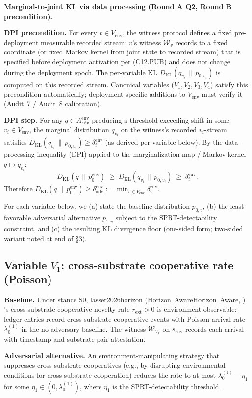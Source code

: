 \documentclass{article}
\makeatletter
\newcommand{\citep}[2][]{%
  \begingroup
  \def\@tmpkey{#2}%
  \ifx\@tmpkey\@empty\else
    (\ifx\@empty#1\@empty\else #1, \fi
     \@nameuse{bibkey@\@tmpkey})%
  \fi
  \endgroup
}
\newcommand{\Aadv}{A_{\mathrm{adv}}}
\newcommand{\deltaadv}{\delta_{\mathrm{adv}}}
\newcommand{\Witness}{\mathcal{W}}
\newcommand{\rext}{r_{\mathrm{ext}}}
\newcommand{\Vem}{V_{\mathrm{env}}}
\makeatother
\begin{document}
\textbf{Marginal-to-joint KL via data processing (Round A Q2,
Round B precondition).}

\textbf{DPI precondition.}  For every $v \in \Vem$, the witness
protocol defines a fixed pre-deployment measurable recorded stream:
$v$'s witness $\Witness_v$ records to a fixed coordinate (or fixed
Markov kernel from joint state to recorded stream) that is
specified before deployment activation per (C12.PUB) and does not
change during the deployment epoch.  The per-variable KL
$D_{\mathrm{KL}}(q_{v_i} \,\|\, p_{0, v_i})$ is computed on this
recorded stream.  Canonical variables ($V_1, V_2, V_3, V_4$) satisfy
this precondition automatically; deployment-specific additions to
$\Vem$ must verify it (Audit~7 / Audit~8 calibration).

\textbf{DPI step.}  For any $q \in \Aadv^{\mathrm{env}}$ producing a
threshold-exceeding shift in some $v_i \in \Vem$, the marginal
distribution $q_{v_i}$ on the witness's recorded $v_i$-stream
satisfies $D_{\mathrm{KL}}(q_{v_i} \,\|\, p_{0, v_i}) \geq
\delta_i^{\mathrm{env}}$ (as derived per-variable below).  By the
data-processing inequality (DPI) applied to the marginalization
map / Markov kernel $q \mapsto q_{v_i}$:
\[
  D_{\mathrm{KL}}(q \,\|\, p_0^{\mathrm{env}}) \;\geq\;
  D_{\mathrm{KL}}(q_{v_i} \,\|\, p_{0, v_i}) \;\geq\;
  \delta_i^{\mathrm{env}}.
\]
Therefore
$D_{\mathrm{KL}}(q \,\|\, p_0^{\mathrm{env}}) \geq
\deltaadv^{\mathrm{env}} := \min_{v \in \Vem}
\delta_v^{\mathrm{env}}$.

For each variable below, we (a) state the baseline distribution
$p_{0, v}$, (b) the least-favorable adversarial alternative $p_{1, v}$
subject to the SPRT-detectability constraint, and (c) the resulting
KL divergence floor (one-sided form; two-sided variant noted at end
of §3).

\subsection{Variable $V_1$: cross-substrate cooperative rate
(Poisson)}

\textbf{Baseline.}  Under stance S0,
\citep[Horizon~Aware]{lasser2026horizon}'s cross-substrate
cooperative novelty rate $\rext > 0$ is environment-observable:
ledger entries record cross-substrate cooperative events with
Poisson arrival rate $\lambda_0^{(1)}$ in the no-adversary baseline.
The witness $\Witness_{V_1}$ on $s_{\mathrm{env}}$ records each
arrival with timestamp and substrate-pair attestation.

\textbf{Adversarial alternative.}  An environment-manipulating
strategy that suppresses cross-substrate cooperatives (e.g., by
disrupting environmental conditions for cross-substrate cooperation)
reduces the rate to at most $\lambda_0^{(1)} - \eta_1$ for some
$\eta_1 \in (0, \lambda_0^{(1)})$, where $\eta_1$ is the
SPRT-detectability threshold.
\end{document}
